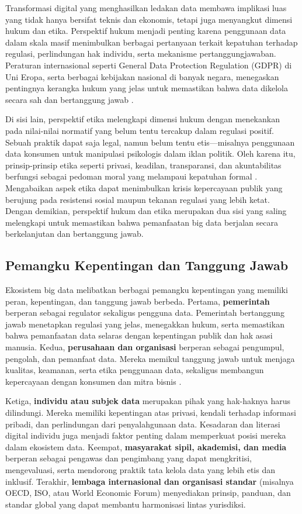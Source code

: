 Transformasi digital yang menghasilkan ledakan data membawa implikasi luas yang tidak hanya bersifat teknis dan ekonomis, tetapi juga menyangkut dimensi hukum dan etika. Perspektif hukum menjadi penting karena penggunaan data dalam skala masif menimbulkan berbagai pertanyaan terkait kepatuhan terhadap regulasi, perlindungan hak individu, serta mekanisme pertanggungjawaban. Peraturan internasional seperti General Data Protection Regulation (GDPR) di Uni Eropa, serta berbagai kebijakan nasional di banyak negara, menegaskan pentingnya kerangka hukum yang jelas untuk memastikan bahwa data dikelola secara sah dan bertanggung jawab \cite{voigt2017gdpr, oecd2015}. 

Di sisi lain, perspektif etika melengkapi dimensi hukum dengan menekankan pada nilai-nilai normatif yang belum tentu tercakup dalam regulasi positif. Sebuah praktik dapat saja legal, namun belum tentu etis—misalnya penggunaan data konsumen untuk manipulasi psikologis dalam iklan politik. Oleh karena itu, prinsip-prinsip etika seperti privasi, keadilan, transparansi, dan akuntabilitas berfungsi sebagai pedoman moral yang melampaui kepatuhan formal \cite{zwitter2014}. Mengabaikan aspek etika dapat menimbulkan krisis kepercayaan publik yang berujung pada resistensi sosial maupun tekanan regulasi yang lebih ketat. Dengan demikian, perspektif hukum dan etika merupakan dua sisi yang saling melengkapi untuk memastikan bahwa pemanfaatan big data berjalan secara berkelanjutan dan bertanggung jawab.

\subsection{Pemangku Kepentingan dan Tanggung Jawab}

Ekosistem big data melibatkan berbagai pemangku kepentingan yang memiliki peran, kepentingan, dan tanggung jawab berbeda. Pertama, \textbf{pemerintah} berperan sebagai regulator sekaligus pengguna data. Pemerintah bertanggung jawab menetapkan regulasi yang jelas, menegakkan hukum, serta memastikan bahwa pemanfaatan data selaras dengan kepentingan publik dan hak asasi manusia. Kedua, \textbf{perusahaan dan organisasi} berperan sebagai pengumpul, pengolah, dan pemanfaat data. Mereka memikul tanggung jawab untuk menjaga kualitas, keamanan, serta etika penggunaan data, sekaligus membangun kepercayaan dengan konsumen dan mitra bisnis \cite{taddeo2016trust}. 

Ketiga, \textbf{individu atau subjek data} merupakan pihak yang hak-haknya harus dilindungi. Mereka memiliki kepentingan atas privasi, kendali terhadap informasi pribadi, dan perlindungan dari penyalahgunaan data. Kesadaran dan literasi digital individu juga menjadi faktor penting dalam memperkuat posisi mereka dalam ekosistem data. Keempat, \textbf{masyarakat sipil, akademisi, dan media} berperan sebagai pengawas dan pengimbang yang dapat mengkritisi, mengevaluasi, serta mendorong praktik tata kelola data yang lebih etis dan inklusif. Terakhir, \textbf{lembaga internasional dan organisasi standar} (misalnya OECD, ISO, atau World Economic Forum) menyediakan prinsip, panduan, dan standar global yang dapat membantu harmonisasi lintas yurisdiksi. 

